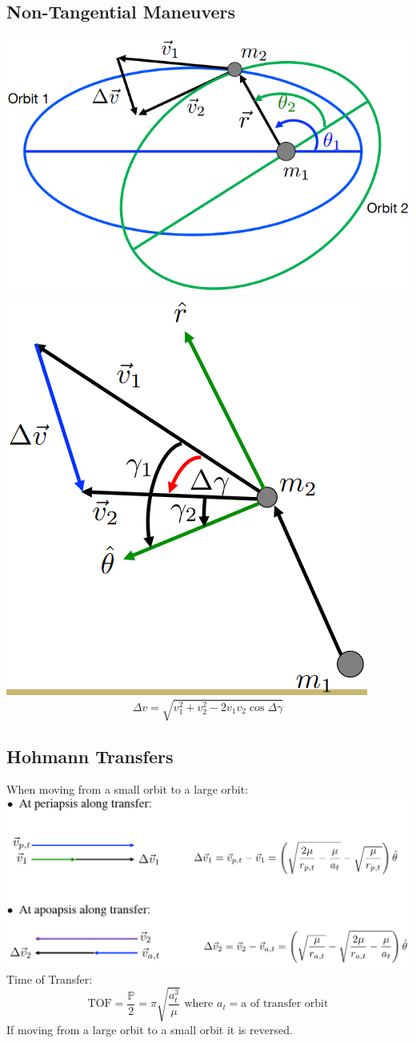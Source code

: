 \documentclass{article}
\begin{document}
\begin{multicols*}{3}
    \subsection*{Non-Tangential Maneuvers}
    \includegraphics[width=0.75\linewidth]{Figures/non_tangential_burn.png}\\
    \includegraphics[width=0.65\linewidth]{Figures/non_tangential_burn_gamma.png}\\
    $$\Delta v = \sqrt{v_1^2+v_2^2-2v_1v_2\cos{\Delta\gamma}}$$
    \subsection*{Hohmann Transfers}
    When moving from a small orbit to a large orbit:
    \includegraphics[width=\linewidth]{Figures/hohmann_transfer.png}\\
    Time of Transfer:\\
    $$\text{TOF}=\frac{\mathbb{P}}{2}=\pi\sqrt{\frac{a_t^3}{\mu}} \text{ where } a_t = \text{a of transfer orbit}$$
    If moving from a large orbit to a small orbit it is reversed.

\end{multicols*}
\end{document}
